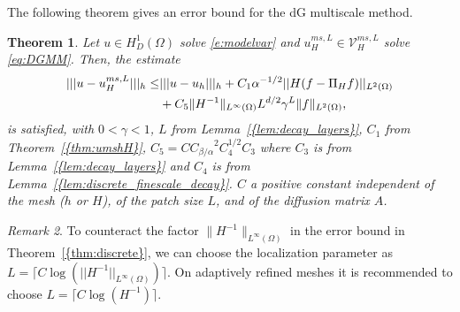 \documentclass[10pt]{article}
\numberwithin{equation}{section}
\theoremstyle{plain}
\newtheorem{theorem}{Theorem}
\theoremstyle{definition}
\theoremstyle{remark}
\newtheorem{rem}[theorem]{Remark}
\begin{document}
The following theorem gives an error bound for the dG multiscale method.
\begin{theorem}\label{thm:discrete}
Let $u\in H^1_D(\Omega)$ solve \eqref{e:modelvar} and ${u^{ms,L}_{H}}\in{\mathcal{V}^{ms,L}_{H}}$ solve \eqref{eq:DGMM}. Then, the estimate
  \begin{equation}\notag
    \begin{aligned}
    {||| {u-{u^{ms,L}_{H}}} |||_h} \leq &{||| {u-u_h} |||_h} + C_1{\alpha}^{-1/2}|| H(f-{\Pi_H} f ) ||_{L^2(\Omega)} \\ &+C_5\|H^{-1}\|_{L^\infty(\Omega)}L^{d/2}\gamma^L\|f\|_{L^2(\Omega)},
    \end{aligned}
  \end{equation}
  is satisfied, with $0<\gamma<1$, $L$ from {Lemma~\ref{{lem:decay_layers}}}, $C_1$ from {Theorem~\ref{{thm:umshH}}}, $C_5=C{C_{{\beta}/{\alpha}}}^2C_4^{1/2}C_3$ where $C_3$ is from {Lemma~\ref{{lem:decay_layers}}} and $C_4$ is from {Lemma~\ref{{lem:discrete_finescale_decay}}}. $C$ a positive constant independent of the mesh ($h$ or $H$), of the patch size $L$, and of the diffusion matrix ${A}$. 
\end{theorem}
\begin{rem}
  To counteract the factor $\|H^{-1}\|_{L^\infty(\Omega)}$ in the error bound in {Theorem~\ref{{thm:discrete}}}, we can choose the localization parameter as $L = \lceil C\log(||H^{-1}||_{L^\infty(\Omega)})\rceil$. On adaptively refined meshes it is recommended to choose $L=\lceil C\log(H^{-1})\rceil$.
\end{rem}
\end{document}
